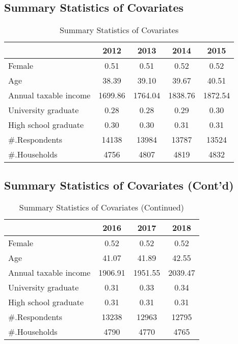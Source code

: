 \documentclass[ review  , 3p ]{elsarticle}
\begin{document}
  \hypertarget{summary-statistics-of-covariates}{%
  \subsection{Summary Statistics of Covariates}\label{summary-statistics-of-covariates}}

  \begin{table}

  \caption{\label{tab:kableSummaryCovariate}Summary Statistics of Covariates}
  \centering
  \begin{tabular}[t]{lcccc}
  \toprule
   & 2012 & 2013 & 2014 & 2015\\
  \midrule
  Female & 0.51 & 0.51 & 0.52 & 0.52\\
  Age & 38.39 & 39.10 & 39.67 & 40.51\\
  Annual taxable income & 1699.86 & 1764.04 & 1838.76 & 1872.54\\
  University graduate & 0.28 & 0.28 & 0.29 & 0.30\\
  High school graduate & 0.30 & 0.30 & 0.31 & 0.31\\
  \#.Respondents & 14138 & 13984 & 13787 & 13524\\
  \#.Households & 4756 & 4807 & 4819 & 4832\\
  \bottomrule
  \end{tabular}
  \end{table}

  \hypertarget{summary-statistics-of-covariates-contd}{%
  \subsection{Summary Statistics of Covariates (Cont'd)}\label{summary-statistics-of-covariates-contd}}

  \begin{table}

  \caption{\label{tab:kableSummaryCovariate2}Summary Statistics of Covariates (Continued)}
  \centering
  \begin{tabular}[t]{lccc}
  \toprule
   & 2016 & 2017 & 2018\\
  \midrule
  Female & 0.52 & 0.52 & 0.52\\
  Age & 41.07 & 41.89 & 42.55\\
  Annual taxable income & 1906.91 & 1951.55 & 2039.47\\
  University graduate & 0.31 & 0.33 & 0.34\\
  High school graduate & 0.31 & 0.31 & 0.31\\
  \#.Respondents & 13238 & 12963 & 12795\\
  \#.Households & 4790 & 4770 & 4765\\
  \bottomrule
  \end{tabular}
  \end{table}
\end{document}
